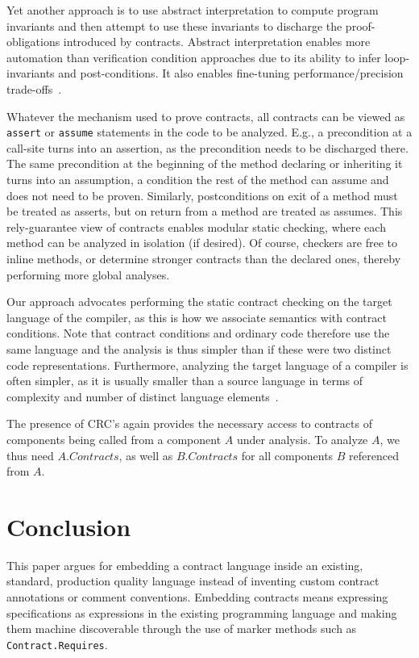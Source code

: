 \documentclass{sig-alternate}
\newcommand{\code}[1]{\lstinline{#1}}
\begin{document}
Yet another approach is to use abstract interpretation to compute
program invariants and then attempt to use these invariants to
discharge the proof-obligations introduced by contracts. Abstract
interpretation enables more automation than verification condition
approaches due to its ability to infer loop-invariants and
post-conditions. It also enables fine-tuning performance/precision
trade-offs~\cite{LogozzoMaf08}.

Whatever the mechanism used to prove contracts, all contracts can be
viewed as \code{assert} or \code{assume} statements in the code to be
analyzed. E.g., a precondition at a call-site turns into an assertion,
as the precondition needs to be discharged there. The same
precondition at the beginning of the method declaring or inheriting it
turns into an assumption, a condition the rest of the method can
assume and does not need to be proven. Similarly, postconditions on exit of a
method must be treated as asserts, but on return from a method are treated as
assumes. This rely-guarantee view of contracts enables modular static
checking, where each method can be analyzed in isolation (if
desired). Of course, checkers are free to inline methods, or determine
stronger contracts than the declared ones, thereby performing more
global analyses.

Our approach advocates performing the static contract checking on the
target language of the compiler, as this is how we associate semantics
with contract conditions. Note that contract conditions and ordinary
code therefore use the same language and the analysis is thus simpler
than if these were two distinct code representations. Furthermore,
analyzing the target language of a compiler is often simpler, as it is
usually smaller than a source language in terms of complexity and
number of distinct language elements~\cite{LogozzoMaf08-2}.

The presence of CRC's again provides the necessary access to contracts
of components being called from a component $A$ under analysis. To
analyze $A$, we thus need $A.Contracts$, as well as $B.Contracts$ for
all components $B$ referenced from $A$.


\section{Conclusion}
\noindent
This paper argues for embedding a contract language inside
an existing, standard, production quality language instead of
inventing custom contract annotations or comment
conventions. Embedding contracts means expressing specifications
 as expressions in the existing programming language and
making them machine discoverable through the use of marker methods
such as \code{Contract.Requires}. 
\end{document}
